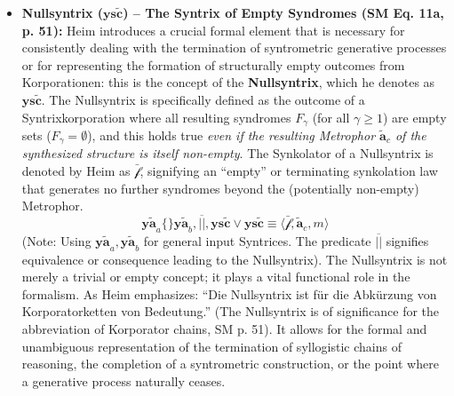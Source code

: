 \documentclass[12pt]{article}
\newcommand{\q}[1]{\enquote{#1}}
\newcommand{\syntrix}{\bm{y\widetilde{a}}}
\newcommand{\metrophor}{\bm{\widetilde{a}}}
\newcommand{\synkolator}{\mathcal{f}}
\newcommand{\synkolationsstufe}{m}
\newcommand{\syndrom}{F} %
\newcommand{\nullsyntrix}{\bm{ys\widetilde{c}}}
\begin{document}
\begin{itemize}
    \item \textbf{Nullsyntrix (\( \nullsyntrix \)) – The Syntrix of Empty Syndromes (SM Eq. 11a, p. 51):}
    Heim introduces a crucial formal element that is necessary for consistently dealing with the termination of syntrometric generative processes or for representing the formation of structurally empty outcomes from Korporationen: this is the concept of the \textbf{Nullsyntrix}, which he denotes as \( \nullsyntrix \). The Nullsyntrix is specifically defined as the outcome of a Syntrixkorporation where all resulting syndromes \( \syndrom_\gamma \) (for all \( \gamma \geq 1 \)) are empty sets (\( \syndrom_\gamma = \emptyset \)), and this holds true \textit{even if the resulting Metrophor \( \metrophor_c \) of the synthesized structure is itself non-empty}. The Synkolator of a Nullsyntrix is denoted by Heim as \( \bar{\synkolator} \), signifying an \q{empty} or terminating synkolation law that generates no further syndromes beyond the (potentially non-empty) Metrophor.
    \begin{equation}
    \syntrix_a \{ \} \syntrix_b, \overline{||}, \nullsyntrix \vee \nullsyntrix \equiv \langle \bar{\synkolator}, \metrophor_c, \synkolationsstufe \rangle
    \label{eq:original_nullsyntrix}
    \end{equation}
    (Note: Using \( \syntrix_a, \syntrix_b \) for general input Syntrices. The predicate \( \overline{||} \) signifies equivalence or consequence leading to the Nullsyntrix). The Nullsyntrix is not merely a trivial or empty concept; it plays a vital functional role in the formalism. As Heim emphasizes: \q{Die Nullsyntrix ist für die Abkürzung von Korporatorketten von Bedeutung.} (The Nullsyntrix is of significance for the abbreviation of Korporator chains, SM p. 51). It allows for the formal and unambiguous representation of the termination of syllogistic chains of reasoning, the completion of a syntrometric construction, or the point where a generative process naturally ceases.


\end{itemize}
\end{document}
